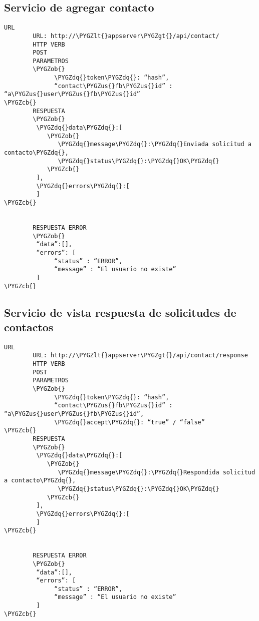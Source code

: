 \documentclass[a4paper,10pt,spanish]{sphinxmanual}
\def\PYGZus{\char`\_}
\def\PYGZob{\char`\{}
\def\PYGZcb{\char`\}}
\def\PYGZlt{\char`\<}
\def\PYGZgt{\char`\>}
\def\PYGZdq{\char`\"}
\begin{document}
\subsection{Servicio de agregar contacto}
\label{apiRest:servicio-de-agregar-contacto}
\begin{Verbatim}[commandchars=\\\{\}]
URL
        URL: http://\PYGZlt{}appserver\PYGZgt{}/api/contact/
        HTTP VERB
        POST
        PARAMETROS
        \PYGZob{}
              \PYGZdq{}token\PYGZdq{}: “hash”,
              “contact\PYGZus{}fb\PYGZus{}id” : “a\PYGZus{}user\PYGZus{}fb\PYGZus{}id”
\PYGZcb{}
        RESPUESTA
        \PYGZob{}
         \PYGZdq{}data\PYGZdq{}:[
            \PYGZob{}
               \PYGZdq{}message\PYGZdq{}:\PYGZdq{}Enviada solicitud a contacto\PYGZdq{},
               \PYGZdq{}status\PYGZdq{}:\PYGZdq{}OK\PYGZdq{}
            \PYGZcb{}
         ],
         \PYGZdq{}errors\PYGZdq{}:[
         ]
\PYGZcb{}


        RESPUESTA ERROR
        \PYGZob{}
         “data”:[],
         “errors”: [
              “status” : “ERROR”,
              “message” : “El usuario no existe”
         ]
\PYGZcb{}
\end{Verbatim}


\subsection{Servicio de vista respuesta de solicitudes de contactos}
\label{apiRest:servicio-de-vista-respuesta-de-solicitudes-de-contactos}
\begin{Verbatim}[commandchars=\\\{\}]
URL
        URL: http://\PYGZlt{}appserver\PYGZgt{}/api/contact/response
        HTTP VERB
        POST
        PARAMETROS
        \PYGZob{}
              \PYGZdq{}token\PYGZdq{}: “hash”,
              “contact\PYGZus{}fb\PYGZus{}id” : “a\PYGZus{}user\PYGZus{}fb\PYGZus{}id”,
              \PYGZdq{}accept\PYGZdq{}: “true” / “false”
\PYGZcb{}
        RESPUESTA
        \PYGZob{}
         \PYGZdq{}data\PYGZdq{}:[
            \PYGZob{}
               \PYGZdq{}message\PYGZdq{}:\PYGZdq{}Respondida solicitud a contacto\PYGZdq{},
               \PYGZdq{}status\PYGZdq{}:\PYGZdq{}OK\PYGZdq{}
            \PYGZcb{}
         ],
         \PYGZdq{}errors\PYGZdq{}:[
         ]
\PYGZcb{}


        RESPUESTA ERROR
        \PYGZob{}
         “data”:[],
         “errors”: [
              “status” : “ERROR”,
              “message” : “El usuario no existe”
         ]
\PYGZcb{}
\end{Verbatim}
\end{document}
